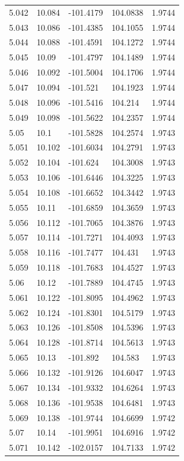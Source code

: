 \begin{tabular}{lllll}
5.042 & 10.084 & -101.4179 & 104.0838 & 1.9744 \\
5.043 & 10.086 & -101.4385 & 104.1055 & 1.9744 \\
5.044 & 10.088 & -101.4591 & 104.1272 & 1.9744 \\
5.045 & 10.09 & -101.4797 & 104.1489 & 1.9744 \\
5.046 & 10.092 & -101.5004 & 104.1706 & 1.9744 \\
5.047 & 10.094 & -101.521 & 104.1923 & 1.9744 \\
5.048 & 10.096 & -101.5416 & 104.214 & 1.9744 \\
5.049 & 10.098 & -101.5622 & 104.2357 & 1.9744 \\
5.05 & 10.1 & -101.5828 & 104.2574 & 1.9743 \\
5.051 & 10.102 & -101.6034 & 104.2791 & 1.9743 \\
5.052 & 10.104 & -101.624 & 104.3008 & 1.9743 \\
5.053 & 10.106 & -101.6446 & 104.3225 & 1.9743 \\
5.054 & 10.108 & -101.6652 & 104.3442 & 1.9743 \\
5.055 & 10.11 & -101.6859 & 104.3659 & 1.9743 \\
5.056 & 10.112 & -101.7065 & 104.3876 & 1.9743 \\
5.057 & 10.114 & -101.7271 & 104.4093 & 1.9743 \\
5.058 & 10.116 & -101.7477 & 104.431 & 1.9743 \\
5.059 & 10.118 & -101.7683 & 104.4527 & 1.9743 \\
5.06 & 10.12 & -101.7889 & 104.4745 & 1.9743 \\
5.061 & 10.122 & -101.8095 & 104.4962 & 1.9743 \\
5.062 & 10.124 & -101.8301 & 104.5179 & 1.9743 \\
5.063 & 10.126 & -101.8508 & 104.5396 & 1.9743 \\
5.064 & 10.128 & -101.8714 & 104.5613 & 1.9743 \\
5.065 & 10.13 & -101.892 & 104.583 & 1.9743 \\
5.066 & 10.132 & -101.9126 & 104.6047 & 1.9743 \\
5.067 & 10.134 & -101.9332 & 104.6264 & 1.9743 \\
5.068 & 10.136 & -101.9538 & 104.6481 & 1.9743 \\
5.069 & 10.138 & -101.9744 & 104.6699 & 1.9742 \\
5.07 & 10.14 & -101.9951 & 104.6916 & 1.9742 \\
5.071 & 10.142 & -102.0157 & 104.7133 & 1.9742 \\

\end{tabular}

